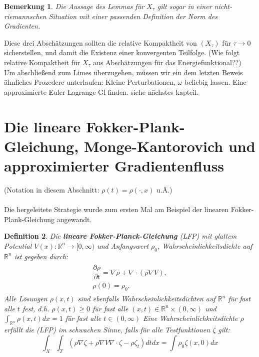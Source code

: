 \documentclass[11pt,a4paper,notitlepage]{scrreprt}
\newcommand{\RR}{\mathbb{R}}
\newtheorem{defi}{Definition}[section]
\newtheorem{bem}[defi]{Bemerkung}
\begin{document}
\begin{bem}
Die Aussage des Lemmas für $X_\tau$ gilt sogar in einer nicht-riemannschen Situation mit einer passenden Definition der Norm des Gradienten. 
\end{bem}

Diese drei Abschätzungen sollten die relative Kompaktheit von $(X_\tau)$ für $\tau \to 0$ sicherstellen, und damit die Existenz einer konvergenten Teilfolge. (Wie folgt relative Kompaktheit für $X_\tau$ aus Abschätzungen für das Energiefunktional??) \\
Um abschließend zum Limes überzugehen, müssen wir ein dem letzten Beweis ähnliches Prozedere unterlaufen: Kleine Perturbationen, $\omega$ beliebig lassen. Eine approximierte Euler-Lagrange-Gl finden. siehe nächstes kapteil. 


\section{Die lineare Fokker-Plank-Gleichung, Monge-Kantorovich und approximierter Gradientenfluss}

(Notation in diesem Abschnitt: $\rho(t)=\rho(\cdot,x)$ u.Ä.)\\\\
Die hergeleitete Strategie wurde zum ersten Mal am Beispiel der linearen Fokker-Plank-Gleichung angewandt. \\
\begin{defi}
Die \textbf{lineare Fokker-Planck-Gleichung} (LFP) mit glattem Potential $V(x):\RR^n\to[0,\infty)$ und Anfangswert $\rho_0$, Wahrscheinlichkeitsdichte auf $\RR^n$ ist gegeben durch:
\begin{eqnarray}
\begin{split}
\dfrac{\partial\rho}{\partial t}=\nabla\rho+\nabla\cdot(\rho\nabla V),\\
\rho(0)=\rho_0.\label{FP}
\end{split}
\end{eqnarray}
Alle Lösungen $\rho(x,t)$ sind ebenfalls Wahrscheinlichkeitsdichten auf $\RR^n$ für fast alle $t$ fest, d.h. $\rho(x,t)\geq 0$ für fast alle $(x,t)\in \RR^n\times(0,\infty)$  und $\int_{\RR^n}\rho(x,t)dx=1$ für fast alle $t\in(0,\infty)$
Eine Wahrscheinlichkeitsdichte $\rho$ erfüllt die (LFP) im schwachen Sinne, falls für alle Testfunktionen $\zeta$ gilt:
\begin{equation}
\int_X \int_T (\rho\nabla\zeta+\rho\nabla V\nabla\cdot\zeta -\rho\zeta_t) dt dx=\int\rho_0\zeta(x,0)dx \label{FPweak}
\end{equation}
\end{defi}
\end{document}
